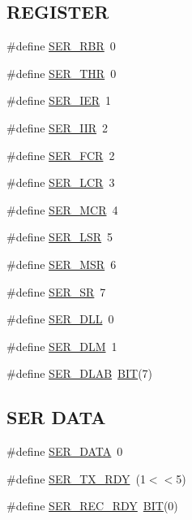 \subsection*{R\+E\+G\+I\+S\+T\+ER}
\begin{DoxyCompactItemize}
\item 
\#define \hyperlink{group__ser__port_gaab10abea0297abdcf0aab7d7d0b5662f}{S\+E\+R\+\_\+\+R\+BR}~0
\item 
\#define \hyperlink{group__ser__port_ga3702c28928f73b9841ab8269f64177ed}{S\+E\+R\+\_\+\+T\+HR}~0
\item 
\#define \hyperlink{group__ser__port_ga783f8e3973a5f87d8af120d49742f834}{S\+E\+R\+\_\+\+I\+ER}~1
\item 
\#define \hyperlink{group__ser__port_ga483c46ea5ed36388947426211cb63eab}{S\+E\+R\+\_\+\+I\+IR}~2
\item 
\#define \hyperlink{group__ser__port_ga9261eef6859842b51e42894b61c5b1c0}{S\+E\+R\+\_\+\+F\+CR}~2
\item 
\#define \hyperlink{group__ser__port_ga6475db6ed9440a92c680e54b2912b191}{S\+E\+R\+\_\+\+L\+CR}~3
\item 
\#define \hyperlink{group__ser__port_ga0f21de7866d73161df9b492b415c370c}{S\+E\+R\+\_\+\+M\+CR}~4
\item 
\#define \hyperlink{group__ser__port_ga382b5d26eb113bfffbf2094eb4405042}{S\+E\+R\+\_\+\+L\+SR}~5
\item 
\#define \hyperlink{group__ser__port_gaf161670921d63a654492758b1998d222}{S\+E\+R\+\_\+\+M\+SR}~6
\item 
\#define \hyperlink{group__ser__port_ga0005836362c1dd009c7fe47720908b1b}{S\+E\+R\+\_\+\+SR}~7
\item 
\#define \hyperlink{group__ser__port_ga858484a29128b93600cd6b8971a91faf}{S\+E\+R\+\_\+\+D\+LL}~0
\item 
\#define \hyperlink{group__ser__port_ga54c2d9bcb790f3a6d0cd71d20ae5d427}{S\+E\+R\+\_\+\+D\+LM}~1
\item 
\#define \hyperlink{group__ser__port_ga2bce41e3ef0b59643bfc314fbdf89545}{S\+E\+R\+\_\+\+D\+L\+AB}~\hyperlink{video__gr_8c_a3a8ea58898cb58fc96013383d39f482c}{B\+IT}(7)
\end{DoxyCompactItemize}
\subsection*{S\+ER D\+A\+TA}
\begin{DoxyCompactItemize}
\item 
\#define \hyperlink{group__ser__port_gadf09d6c9cf68d22c596eb240a5febffb}{S\+E\+R\+\_\+\+D\+A\+TA}~0
\item 
\#define \hyperlink{group__ser__port_ga39627267c307802e2a030abe796fb97b}{S\+E\+R\+\_\+\+T\+X\+\_\+\+R\+DY}~(1$<$$<$5)
\item 
\#define \hyperlink{group__ser__port_ga3eb8525f2a4c6e405b2528526c71b0cf}{S\+E\+R\+\_\+\+R\+E\+C\+\_\+\+R\+DY}~\hyperlink{video__gr_8c_a3a8ea58898cb58fc96013383d39f482c}{B\+IT}(0)
\end{DoxyCompactItemize}
